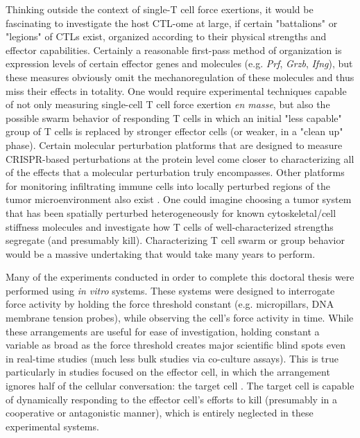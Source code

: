 Thinking outside the context of single-T cell force exertions, it would be fascinating to investigate the host CTL-ome at large, if certain "battalions" or "legions" of CTLs exist, organized according to their physical strengths and effector capabilities. Certainly a reasonable first-pass method of organization is expression levels of certain effector genes and molecules (e.g. \textit{Prf}, \textit{Grzb}, \textit{Ifng}), but these measures obviously omit the  mechanoregulation of these molecules and thus miss their effects in totality. One would require  experimental techniques capable of not only measuring single-cell T cell force exertion \textit{en masse}, but also the possible swarm behavior of responding T cells in which an initial "less capable" group of T cells is replaced by stronger effector cells (or weaker, in a "clean up" phase). Certain molecular perturbation platforms that are designed to measure CRISPR-based perturbations at the protein level \cite{Wroblewska2018} come closer to characterizing all of the effects that a molecular perturbation truly encompasses. Other platforms for monitoring infiltrating immune cells into locally perturbed regions of the tumor microenvironment also exist \cite{MaximeDhainaut2021}. One could imagine choosing a tumor system that has been spatially perturbed heterogeneously for known cytoskeletal/cell stiffness molecules and investigate how T cells of well-characterized strengths segregate (and presumably kill). Characterizing T cell swarm or group behavior would be a massive undertaking that would take many years to perform.

Many of the experiments conducted in order to complete this doctoral thesis were performed using \textit{in vitro} systems. These systems were designed to interrogate force activity by holding the force threshold constant (e.g. micropillars, DNA membrane tension probes), while observing the cell's force activity in time. While these arrangements are useful for ease of investigation, holding constant a variable as broad as the force threshold creates major scientific blind spots even in real-time studies (much less bulk studies via co-culture assays). This is true particularly in studies focused on the effector cell, in which the arrangement ignores half of the cellular conversation: the target cell \cite{Tello-lafoz2021}. The target cell is capable of dynamically responding to the effector cell's efforts to kill (presumably in a cooperative or antagonistic manner), which is entirely neglected in these experimental systems. 

